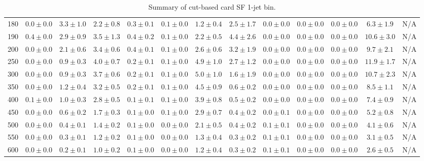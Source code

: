 \begin{table}
{\begin{center}
\begin{tabular}{l | c c | c c c c c c c c  | c c}
180 & $0.0\pm0.0$ & $3.3\pm1.0$ & $2.2\pm0.8$ & $0.3\pm0.1$ & $0.1\pm0.0$ & $1.2\pm0.4$ & $2.5\pm1.7$ & $0.0\pm0.0$ & $0.0\pm0.0$ & $0.0\pm0.0$ & $6.3\pm1.9$ &  N/A \\
190 & $0.4\pm0.0$ & $2.9\pm0.9$ & $3.5\pm1.3$ & $0.4\pm0.2$ & $0.1\pm0.0$ & $2.2\pm0.5$ & $4.4\pm2.6$ & $0.0\pm0.0$ & $0.0\pm0.0$ & $0.0\pm0.0$ & $10.6\pm3.0$ & N/A \\
200 & $0.0\pm0.0$ & $2.1\pm0.6$ & $3.4\pm0.6$ & $0.4\pm0.1$ & $0.1\pm0.0$ & $2.6\pm0.6$ & $3.2\pm1.9$ & $0.0\pm0.0$ & $0.0\pm0.0$ & $0.0\pm0.0$ & $9.7\pm2.1$ & N/A \\
250 & $0.0\pm0.0$ & $0.9\pm0.3$ & $4.0\pm0.7$ & $0.2\pm0.1$ & $0.1\pm0.0$ & $4.9\pm1.0$ & $2.7\pm1.2$ & $0.0\pm0.0$ & $0.0\pm0.0$ & $0.0\pm0.0$ & $11.9\pm1.7$ &N/A \\
300 & $0.0\pm0.0$ & $0.9\pm0.3$ & $3.7\pm0.6$ & $0.2\pm0.1$ & $0.1\pm0.0$ & $5.0\pm1.0$ & $1.6\pm1.9$ & $0.0\pm0.0$ & $0.0\pm0.0$ & $0.0\pm0.0$ & $10.7\pm2.3$ &N/A \\
350 & $0.0\pm0.0$ & $1.2\pm0.4$ & $3.2\pm0.5$ & $0.2\pm0.1$ & $0.1\pm0.0$ & $4.5\pm0.9$ & $0.6\pm0.2$ & $0.0\pm0.0$ & $0.0\pm0.0$ & $0.0\pm0.0$ & $8.5\pm1.1$ & N/A \\
400 & $0.1\pm0.0$ & $1.0\pm0.3$ & $2.8\pm0.5$ & $0.1\pm0.1$ & $0.1\pm0.0$ & $3.9\pm0.8$ & $0.5\pm0.2$ & $0.0\pm0.0$ & $0.0\pm0.0$ & $0.0\pm0.0$ & $7.4\pm0.9$ & N/A \\
450 & $0.0\pm0.0$ & $0.6\pm0.2$ & $1.7\pm0.3$ & $0.1\pm0.0$ & $0.1\pm0.0$ & $2.9\pm0.7$ & $0.4\pm0.2$ & $0.0\pm0.1$ & $0.0\pm0.0$ & $0.0\pm0.0$ & $5.2\pm0.8$ & N/A \\
500 & $0.0\pm0.0$ & $0.4\pm0.1$ & $1.4\pm0.2$ & $0.1\pm0.0$ & $0.0\pm0.0$ & $2.1\pm0.5$ & $0.4\pm0.2$ & $0.1\pm0.1$ & $0.0\pm0.0$ & $0.0\pm0.0$ & $4.1\pm0.6$ & N/A \\
550 & $0.0\pm0.0$ & $0.3\pm0.1$ & $1.2\pm0.2$ & $0.1\pm0.0$ & $0.0\pm0.0$ & $1.3\pm0.4$ & $0.3\pm0.2$ & $0.1\pm0.1$ & $0.0\pm0.0$ & $0.0\pm0.0$ & $3.1\pm0.5$ & N/A \\
600 & $0.0\pm0.0$ & $0.2\pm0.1$ & $1.0\pm0.2$ & $0.1\pm0.0$ & $0.0\pm0.0$ & $1.2\pm0.4$ & $0.3\pm0.2$ & $0.1\pm0.1$ & $0.0\pm0.0$ & $0.0\pm0.0$ & $2.6\pm0.5$ & N/A \\
\hline
\end{tabular}
\end{center}
}
\caption{Summary of cut-based card SF 1-jet bin.}
\end{table}
